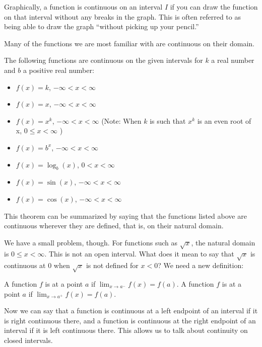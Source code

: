 \documentclass{ximera}
\begin{document}
Graphically, a function is continuous on an interval $I$ if you can
draw the function on that interval without any breaks in the graph.
This is often referred to as being able to draw the graph ``without
picking up your pencil.''

Many of the functions we are most familiar with are continuous on
their domain.

\begin{theorem}\label{theorem:continuity}
The following functions are continuous on the given intervals for $k$ a real number and $b$ a positive real number:
\begin{itemize}
\item $f(x)=k$, $-\infty <x <\infty$
\item $f(x)=x$,  $-\infty <x <\infty$
\item $f(x)=x^k$, $-\infty<x<\infty$ (Note: When $k$ is such that $x^k$ is an even root of x, $0\leq x <\infty$ ) %
\item $f(x)=b^x$,  $-\infty <x <\infty$
\item $f(x)=\log_b(x)$, $0<x<\infty$ 
\item $f(x)=\sin(x)$, $-\infty <x <\infty$
\item $f(x)=\cos(x)$, $-\infty <x <\infty$
\end{itemize}
\end{theorem}

This theorem can be summarized by saying that the functions listed above are continuous wherever they are defined, that is, on their natural domain. 

We have a small problem, though.  For functions such as $\sqrt{x}$, the natural domain is $0\leq x <\infty$.  This is not an open interval.  What does it mean to say that $\sqrt{x}$ is continuous at 0 when $\sqrt{x}$ is not defined for $x<0$?  We need a new definition:

\begin{definition}
  A function $f$ is  at a point $a$ if $\lim_{x\to a^-}
  f(x) = f(a)$.   A function $f$ is  at a point $a$ if $\lim_{x\to a^+}
  f(x) = f(a)$.  
\end{definition}

Now we can say that a function is continuous at a left endpoint of an interval if it is right continuous there, and a function is continuous at the right endpoint of an interval if it is left continuous there. This allows us to talk about continuity on closed intervals.  
\end{document}

